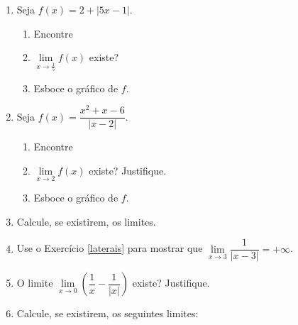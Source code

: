 \begin{enumerate}
\item Seja $f(x) = 2 + |5x-1|$. 
\begin{enumerate}
    \item Encontre
        \begin{enumerate}
        \end{enumerate}
    \item $\lim\limits_{x\to\frac{1}{5}} f(x)$ existe?
    \item Esboce o gráfico de $f$.
\end{enumerate}

\item Seja $f(x)=\dfrac{x^2+x-6}{|x-2|}$.
\begin{enumerate}
    \item Encontre
    \begin{enumerate}
    \end{enumerate}
    \item $\lim\limits_{x \to 2}f(x)$ existe? Justifique.
    \item Esboce o gráfico de $f$.
\end{enumerate}

\item \label{laterais} Calcule, se existirem, os  limites.
\begin{enumerate}
\end{enumerate}   
\item Use o Exercício \ref{laterais} para mostrar que $\lim\limits_{x\to 3}\dfrac{ 1}{ |x - 3|}=+\infty $.
\item O limite $\lim\limits_{x\to 0}\left(\dfrac{1}{x}-\dfrac{1}{|x|}\right)$ existe? Justifique.
\item Calcule, se existirem, os seguintes limites:


\end{enumerate}
